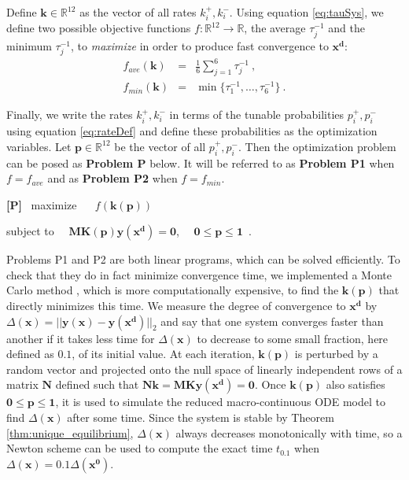 Define $\mathbf{k} \in \mathbb{R}^{12}$ as the vector of all rates
$k_i^+, k_i^-$. Using equation \eqref{eq:tauSys}, we define two
possible objective functions $f:\mathbb{R}^{12} \rightarrow
\mathbb{R}$, the average $\tau_j^{-1}$ and the minimum
$\tau_j^{-1}$, to {\it maximize} in order to produce fast
convergence to $\mathbf{x^d}$:
\begin{eqnarray}
f_{ave}(\mathbf{k}) &=& \tfrac{1}{6} \sum_{j=1}^{6} \tau_j^{-1}~, \label{eq:obj1} \\
f_{min}(\mathbf{k}) &=& \min \{ \tau_1^{-1}, \ldots,
\tau_{6}^{-1}\}~. \label{eq:obj2}
\end{eqnarray}


Finally, we write the rates $k_i^+, k_i^-$ in terms of the tunable
probabilities $p_i^+, p_i^-$ using equation \eqref{eq:rateDef} and
define these probabilities as the optimization variables.  Let
$\mathbf{p} \in \mathbb{R}^{12}$ be the vector of all $p_i^+,
p_i^-$.  Then the optimization problem can be posed as
\textbf{Problem P} below.  It will be referred to as \textbf{Problem
P1} when $f = f_{ave}$ and as \textbf{Problem P2} when $f =
f_{min}$.

\vspace{3mm} \noindent \textbf{[P] } \hspace{2mm} ~maximize ~~
$f(\mathbf{k(p)})$

\vspace{1mm}

\hspace{7mm} subject to ~~$\mathbf{M}\mathbf{K(p)}\mathbf{y(x^d)} =
\mathbf{0}$, ~~$\mathbf{0} \leq \mathbf{p} \leq \mathbf{1}$~.
\vspace{2mm}

Problems P1 and P2 are both linear programs, which can be solved
efficiently.  To check that they do in fact minimize convergence
time, we implemented a Monte Carlo method \cite{ref:Landau00}, which
is more computationally expensive, to find the $\mathbf{k(p)}$ that
directly minimizes this time. We measure the degree of convergence
to $\mathbf{x^d}$ by $\Delta(\mathbf{x}) =
||\mathbf{y(x)}-\mathbf{y(x^d)}||_2$ and say that one system
converges faster than another if it takes less time for
$\Delta(\mathbf{x})$ to decrease to some small fraction, here
defined as $0.1$, of its initial value.  At each iteration,
$\mathbf{k(p)}$ is perturbed by a random vector and projected onto
the null space of linearly independent rows of a matrix $\mathbf{N}$
defined such that $\mathbf{N}\mathbf{k} =
\mathbf{M}\mathbf{K}\mathbf{y(x^d)} = \mathbf{0}$.  Once
$\mathbf{k(p)}$ also satisfies $\mathbf{0} \leq \mathbf{p} \leq
\mathbf{1}$, it is used to simulate the reduced macro-continuous ODE
model to find $\Delta(\mathbf{x})$ after some time. Since the system
is stable by Theorem \ref{thm:unique_equilibrium},
$\Delta(\mathbf{x})$ always decreases monotonically with time, so a
Newton scheme can be used to compute the exact time $t_{0.1}$ when
$\Delta(\mathbf{x}) = 0.1\Delta(\mathbf{x^0})$.

